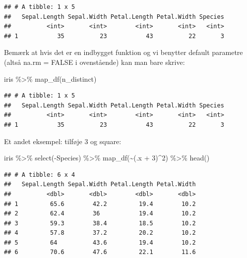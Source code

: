 \documentclass[
]{book}
\newenvironment{Shaded}{\begin{snugshade}}{\end{snugshade}}
\newcommand{\DecValTok}[1]{\textcolor[rgb]{0.00,0.00,0.81}{#1}}
\newcommand{\FunctionTok}[1]{\textcolor[rgb]{0.00,0.00,0.00}{#1}}
\newcommand{\NormalTok}[1]{#1}
\newcommand{\SpecialCharTok}[1]{\textcolor[rgb]{0.00,0.00,0.00}{#1}}
\begin{document}
\begin{verbatim}
## # A tibble: 1 x 5
##   Sepal.Length Sepal.Width Petal.Length Petal.Width Species
##          <int>       <int>        <int>       <int>   <int>
## 1           35          23           43          22       3
\end{verbatim}

Bemærk at hvis det er en indbygget funktion og vi benytter default parametre (altså na.rm = FALSE i ovenstående) kan man bare skrive:

\begin{Shaded}
\begin{Highlighting}[]
\NormalTok{iris }\SpecialCharTok{\%\textgreater{}\%}
  \FunctionTok{map\_df}\NormalTok{(n\_distinct)}
\end{Highlighting}
\end{Shaded}

\begin{verbatim}
## # A tibble: 1 x 5
##   Sepal.Length Sepal.Width Petal.Length Petal.Width Species
##          <int>       <int>        <int>       <int>   <int>
## 1           35          23           43          22       3
\end{verbatim}

Et andet eksempel: tilføje 3 og square:

\begin{Shaded}
\begin{Highlighting}[]
\NormalTok{iris }\SpecialCharTok{\%\textgreater{}\%}
  \FunctionTok{select}\NormalTok{(}\SpecialCharTok{{-}}\NormalTok{Species) }\SpecialCharTok{\%\textgreater{}\%}
  \FunctionTok{map\_df}\NormalTok{(}\SpecialCharTok{\textasciitilde{}}\NormalTok{(.x }\SpecialCharTok{+} \DecValTok{3}\NormalTok{)}\SpecialCharTok{\^{}}\DecValTok{2}\NormalTok{) }\SpecialCharTok{\%\textgreater{}\%} \FunctionTok{head}\NormalTok{()}
\end{Highlighting}
\end{Shaded}

\begin{verbatim}
## # A tibble: 6 x 4
##   Sepal.Length Sepal.Width Petal.Length Petal.Width
##          <dbl>       <dbl>        <dbl>       <dbl>
## 1         65.6        42.2         19.4        10.2
## 2         62.4        36           19.4        10.2
## 3         59.3        38.4         18.5        10.2
## 4         57.8        37.2         20.2        10.2
## 5         64          43.6         19.4        10.2
## 6         70.6        47.6         22.1        11.6
\end{verbatim}
\end{document}
